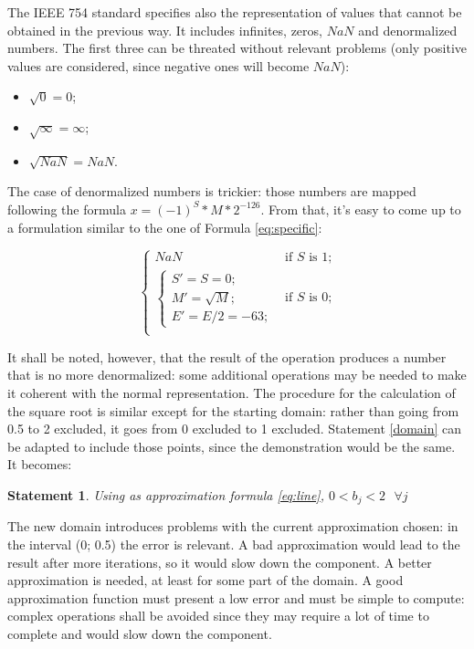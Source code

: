 \documentclass[paper=letter, fontsize=12pt]{article}
\newtheorem{theorem}{Statement}
\begin{document}
The IEEE 754 standard specifies also the representation of values that cannot be obtained in the previous way. It includes infinites, zeros, \(NaN\) and denormalized numbers. The first three can be threated without relevant problems (only positive values are considered, since negative ones will become \(NaN\)):
\begin{itemize}
    \item \(\sqrt{0} = 0\);
    \item \(\sqrt{\infty} = \infty\);
    \item \(\sqrt{NaN} = NaN\).
\end{itemize}
The case of denormalized numbers is trickier: those numbers are mapped following the formula \(x = (-1)^S * M * 2^{-126}\). From that, it's easy to come up to a formulation similar to the one of Formula \ref{eq:specific}:

\begin{equation}
    \label{eq:1.3}
    \begin{cases}
        NaN & \mbox{if }S\mbox{ is 1;}\\[2mm]
        \begin{cases}
            S' = S = 0;\\
            M' = \sqrt{M};\\
            E' = E/2 = -63;
        \end{cases} & \mbox{if }S\mbox{ is 0;}\\
    \end{cases}
\end{equation}

It shall be noted, however, that the result of the operation produces a number that is no more denormalized: some additional operations may be needed to make it coherent with the normal representation. The procedure for the calculation of the square root is similar except for the starting domain: rather than going from 0.5 to 2 excluded, it goes from 0 excluded to 1 excluded. Statement \ref{domain} can be adapted to include those points, since the demonstration would be the same. It becomes:

\begin{theorem}
    \label{domain2}
    Using as approximation formula \ref{eq:line}, \(0 < b_j < 2\mbox{ } \forall j\)
\end{theorem}

The new domain introduces problems with the current approximation chosen: in the interval (0; 0.5) the error is relevant. A bad approximation would lead to the result after more iterations, so it would slow down the component. A better approximation is needed, at least for some part of the domain. A good approximation function must present a low error and must be simple to compute: complex operations shall be avoided since they may require a lot of time to complete and would slow down the component.
\end{document}
